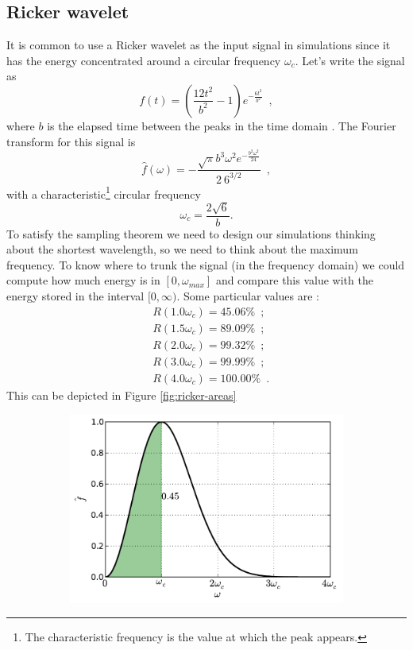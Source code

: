 \documentclass[12pt,letterpaper]{article}
\begin{document}
{\subsection{Ricker wavelet}
It is common to use a Ricker wavelet as the input signal in simulations since it has the energy concentrated around a circular frequency $\omega_{c}$. Let's write the signal as 
\[f(t)=\left(\frac{12t^{2}}{b^{2}}-1\right)e^{-\frac{6t^{2}}{b^{2}}}\enspace,\]
 where $b$ is the elapsed time between the peaks in the time domain \cite{Papageorgiou91}. The Fourier transform for this signal is  
\[\hat{f}(\omega)=-\frac{\sqrt{\pi}b^{3}\omega^{2}e^{-\frac{b^{2}\omega^{2}}{24}}}{2\ 6^{3/2}}\enspace, \]
with a characteristic\footnote{The characteristic frequency is the value at which the peak appears.} circular frequency 
\[\omega_{c}=\frac{2\sqrt{6}}{b}. \]
To satisfy the sampling theorem we need to design our simulations
thinking about the shortest wavelength, so we need to think about
the maximum frequency. To know where to trunk the signal (in the frequency domain) we could compute how much energy is in $[0,\omega_{max}]$ and compare this value with the energy stored in the interval $[0,\infty)$. Some particular values are : 
\begin{align*}
 & R(1.0\omega_{c})=45.06\%\enspace;\\
 & R(1.5\omega_{c})=89.09\%\enspace;\\
 & R(2.0\omega_{c})=99.32\%\enspace;\\
 & R(3.0\omega_{c})=99.99\%\enspace;\\
 & R(4.0\omega_{c})=100.00\%\enspace.
\end{align*}
This can be depicted in Figure \ref{fig:ricker-areas}
\begin{figure}[h]
    \centering
    \begin{subfigure}[b]{0.45\textwidth}
        \includegraphics[width=\textwidth]{img/ricker_area=1.pdf}

\end{subfigure}
\end{figure}}
\end{document}
